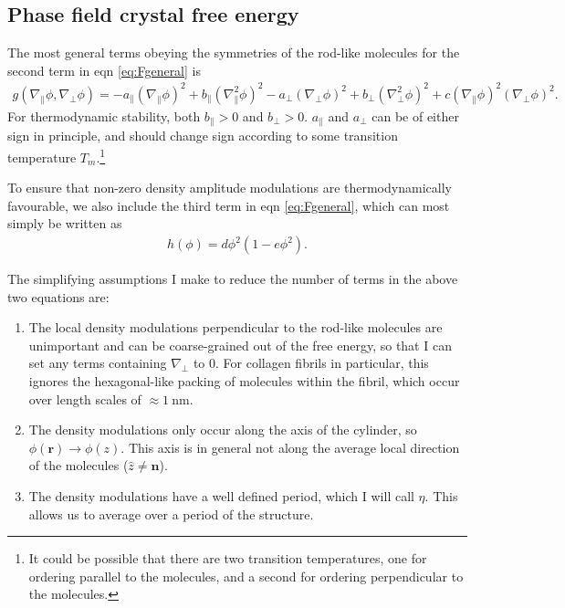 \documentclass[12pt]{article}
\begin{document}
\subsection{Phase field crystal free energy}
The most general terms obeying the symmetries of the rod-like molecules for the second term in eqn \ref{eq:Fgeneral} is
\begin{align}
g(\nabla_{\parallel}\phi,\nabla_{\bot}\phi)=-a_{\parallel}(\nabla_{\parallel}\phi)^2+b_{\parallel}(\nabla_{\parallel}^2\phi)^2-a_{\bot}(\nabla_{\bot}\phi)^2+b_{\bot}(\nabla_{\bot}^2\phi)^2+c(\nabla_{\parallel}\phi)^2(\nabla_{\bot}\phi)^2.
\end{align}
For thermodynamic stability, both $b_{\parallel}>0$ and $b_{\bot}>0$. $a_{\parallel}$ and $a_{\bot}$ can be of either sign in principle, and should change sign according to some transition temperature $T_m$.\footnote{It could be possible that there are two transition temperatures, one for ordering parallel to the molecules, and a second for ordering perpendicular to the molecules.}

To ensure that non-zero density amplitude modulations are thermodynamically favourable, we also include the third term in eqn \ref{eq:Fgeneral}, which can most simply be written as
\begin{align}
h(\phi)=d\phi^2(1-e\phi^2).
\end{align}

The simplifying assumptions I make to reduce the number of terms in the above two equations are:
\begin{enumerate}[label=2.\alph*]
\item \label{asspfc:1} The local density modulations perpendicular to the rod-like molecules are unimportant and can be coarse-grained out of the free energy, so that I can set any terms containing $\nabla_{\bot}$ to $0$. For collagen fibrils in particular, this ignores the hexagonal-like packing of molecules within the fibril, which occur over length scales of $\approx\SI{1}{\nano\meter}$.
\item \label{asspfc:2} The density modulations only occur along the axis of the cylinder, so $\phi(\bm{r})\to\phi(z)$. This axis is in general not along the average local direction of the molecules ($\hat{z}\neq\bm{n}$).
\item \label{asspfc:3} The density modulations have a well defined period, which I will call $\eta$. This allows us to average over a period of the structure.
\end{enumerate}
\end{document}
